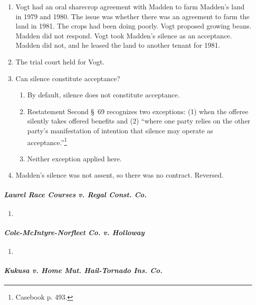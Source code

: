 \begin{enumerate}
    \item Vogt had an oral sharecrop agreement with Madden to farm Madden's 
    land in 1979 and 1980. The issue was whether there was an agreement to 
    farm the land in 1981. The crops had been doing poorly. Vogt proposed 
    growing beans. Madden did not respond. Vogt took Madden's silence as an 
    acceptance. Madden did not, and he leased the land to another tenant for 
    1981.
    \item The trial court held for Vogt.
    \item Can silence constitute acceptance?
    \begin{enumerate}
        \item By default, silence does not constitute acceptance.
        \item Restatement Second \S\ 69 recognizes two exceptions: (1) when 
        the offeree silently takes offered benefits and (2) ``where one party 
        relies on the other party's manifestation of intention that silence 
        may operate as acceptance.''\footnote{Casebook p. 493.}
        \item Neither exception applied here.
    \end{enumerate}
    \item Madden's silence was not assent, so there was no contract. Reversed.
\end{enumerate}

\paragraph{\emph{Laurel Race Courses v. Regal Const. Co.}}

\begin{enumerate}
    \item %
\end{enumerate}

\paragraph{\emph{Cole-McIntyre-Norfleet Co. v. Holloway}}

\begin{enumerate}
    \item %
\end{enumerate}

\paragraph{\emph{Kukusa v. Home Mut. Hail-Tornado Ins. Co.}}

